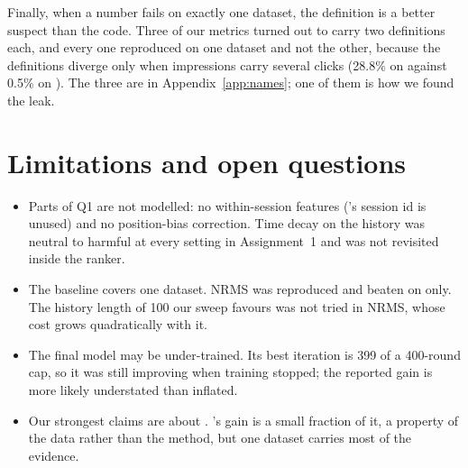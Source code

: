 Finally, when a number fails on exactly one dataset, the definition is a better suspect than the
code. Three of our metrics turned out to carry two definitions each, and every one reproduced on
one dataset and not the other, because the definitions diverge only when impressions carry several
clicks (28.8\% on \mind{} against 0.5\% on \eb{}). The three are in Appendix~\ref{app:names}; one
of them is how we found the leak.

\section{Limitations and open questions}
\label{sec:limits}

\begin{itemize}
\item Parts of Q1 are not modelled: no within-session features (\eb{}'s session id is
  unused) and no position-bias correction. Time decay on the history was neutral to harmful at
  every setting in Assignment~1 and was not revisited inside the ranker.
\item The baseline covers one dataset. NRMS was reproduced and beaten on \eb{} only. The
  history length of 100 our sweep favours was not tried in NRMS, whose cost grows quadratically
  with it.
\item The final model may be under-trained. Its best iteration is 399 of a 400-round cap,
  so it was still improving when training stopped; the reported gain is more likely understated
  than inflated.
\item Our strongest claims are about \eb{}. \mind{}'s gain is a small fraction of it, a
  property of the data rather than the method, but one dataset carries most of the evidence.
\end{itemize}
